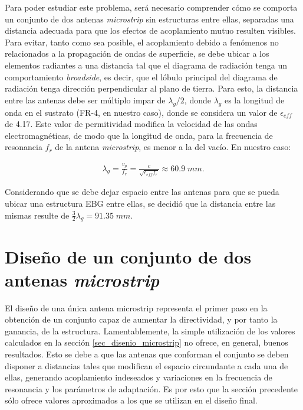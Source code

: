 Para poder estudiar este problema, será necesario comprender cómo se comporta un conjunto de dos antenas \textit{microstrip} sin estructuras entre ellas, separadas una distancia adecuada para que los efectos de acoplamiento mutuo resulten visibles. Para evitar, tanto como sea posible, el acoplamiento debido a fenómenos no relacionados a la propagación de ondas de superficie, se debe ubicar a los elementos radiantes a una distancia tal que el diagrama de radiación tenga un comportamiento \textit{broadside}, es decir, que el lóbulo principal del diagrama de radiación tenga dirección perpendicular al plano de tierra. Para esto, la distancia entre las antenas debe ser múltiplo impar de $\lambda_g/2$, donde $\lambda_g$ es la longitud de onda en el sustrato (FR-4, en nuestro caso), donde se considera un valor de $\epsilon_{eff}$ de 4.17. Este valor de permitividad modifica la velocidad de las ondas electromagnéticas, de modo que la longitud de onda, para la frecuencia de resonancia $f_r$ de la antena \textit{microstrip}, es menor a la del vacío. En nuestro caso:

\begin{align}
	\label{eq:lambdag}
	\lambda_g = \frac{v_p}{f_r} = \frac{c}{\sqrt{\epsilon_{eff} f_r}} \approx 60.9\; mm.
\end{align}

Considerando que se debe dejar espacio entre las antenas para que se pueda ubicar una estructura EBG entre ellas, se decidió que la distancia entre las mismas resulte de $\frac{3}{2} \lambda_g = 91.35\;mm$.






\section{Diseño de un conjunto de dos antenas \textit{microstrip}}
\label{sec_conjunto}
El diseño de una única antena microstrip representa el primer paso en la obtención de un conjunto capaz de aumentar la directividad, y por tanto la ganancia, de la estructura. Lamentablemente, la simple utilización de los valores calculados en la sección \ref{sec_disenio_microstrip} no ofrece, en general, buenos resultados. Esto se debe a que las antenas que conforman el conjunto se deben disponer a distancias tales que modifican el espacio circundante a cada una de ellas, generando acoplamiento indeseados y variaciones en la frecuencia de resonancia y los parámetros de adaptación. Es por esto que la sección precedente sólo ofrece valores aproximados a los que se utilizan en el diseño final.

